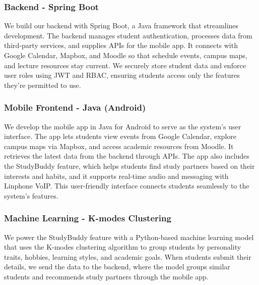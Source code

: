 \documentclass[12pt]{article}
\begin{document}
\pagebreak

\subsubsection{Backend - Spring Boot}
We build our backend with Spring Boot, a Java framework that streamlines development. 
The backend manages student authentication, processes data from third-party services, and supplies APIs for the mobile app. 
It connects with Google Calendar, Mapbox, and Moodle so that schedule events, campus maps, and lecture resources stay current. 
We securely store student data and enforce user roles using JWT and RBAC, ensuring students access only the features they’re permitted to use.

\subsubsection{Mobile Frontend - Java (Android)}
We develop the mobile app in Java for Android to serve as the system’s user interface. 
The app lets students view events from Google Calendar, explore campus maps via Mapbox, and access academic resources from Moodle. 
It retrieves the latest data from the backend through APIs. 
The app also includes the StudyBuddy feature, which helps students find study partners based on their interests and habits, and it supports real-time audio and messaging with Linphone VoIP. 
This user-friendly interface connects students seamlessly to the system’s features.

\subsubsection{Machine Learning - K-modes Clustering}
We power the StudyBuddy feature with a Python-based machine learning model that uses the K-modes clustering algorithm to group students by personality traits, hobbies, learning styles, and academic goals. 
When students submit their details, we send the data to the backend, where the model groups similar students and recommends study partners through the mobile app.
\end{document}
